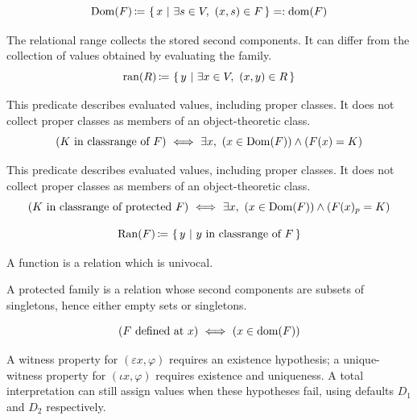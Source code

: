 \begin{definition}
\[
\Dom(F)\ceq \cc{x}{\exists s\in V,\ (x,s)\in F}=:\dom(F)
\]
\end{definition}

\begin{definition}
The relational range collects the stored second components. It can differ
from the collection of values obtained by evaluating the family.
\[
\ran(R)\ceq \cc{y}{\exists x\in V,\ (x,y)\in R}
\]
\end{definition}

\begin{definition}
This predicate describes evaluated values, including proper classes.
It does not collect proper classes as members of an object-theoretic class.
\[
(K\mbox{ in classrange of }F) \ \Longleftrightarrow\  \exists x,\  (x \in \mathrm{Dom}(F)) \land (F(x)=K)
\]
\end{definition}
\begin{definition}
This predicate describes evaluated values, including proper classes.
It does not collect proper classes as members of an object-theoretic class.
\[
(K\mbox{ in classrange of protected }F) \ \Longleftrightarrow\  \exists x,\ (x \in \mathrm{Dom}(F)) \land (F(x)_p=K)
\]
\end{definition}


\begin{definition}
\[
\mathrm{Ran}(F)\,{\coloneqq}\, \left\{\,y\ \middle|\  y\mbox{ in classrange of } F\,\right\}
\]
\end{definition}

\begin{definition}[function]
A function is a relation which is univocal.
\end{definition}
\begin{definition}
A protected family is a relation whose second components are subsets of
singletons, hence either empty sets or singletons.
\end{definition}



\begin{definition}[r/f/F is defined at $x$]
\[
(F \mathrm{\ defined}\mbox{ at }x) \ \Longleftrightarrow\  (x\in\mathrm{dom}(F))
\]
\end{definition}
A witness property for $(\varepsilon x,\varphi)$ requires an existence
hypothesis; a unique-witness property for $(\iota x,\varphi)$ requires
existence and uniqueness. A total interpretation can still assign values
when these hypotheses fail, using defaults $D_1$ and $D_2$ respectively.

